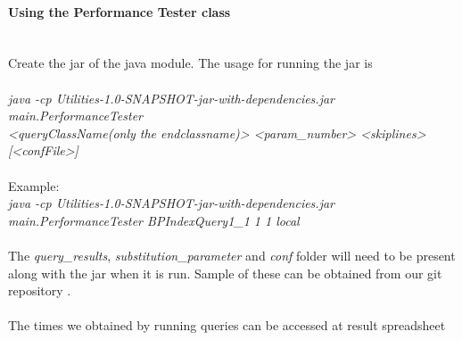 \paragraph{Using the Performance Tester class}
$\:$\\
Create the jar of the java module. The usage for running the jar is
\\\\
\textit{java -cp Utilities-1.0-SNAPSHOT-jar-with-dependencies.jar main.PerformanceTester\\<queryClassName(only the endclassname)> <param\_number> <skiplines> [<confFile>]}
\\\\
Example:
\\
\textit{java -cp Utilities-1.0-SNAPSHOT-jar-with-dependencies.jar main.PerformanceTester BPIndexQuery1\_1 1 1 local}
\\\\
The \textit{query\_results}, \textit{substitution\_parameter} and \textit{conf} folder will need to be present along with the jar when it is run. Sample of these can be obtained from our git repository \cite{repo}.
\\\\
The times we obtained by running queries can be accessed at result spreadsheet\cite{runtime}



